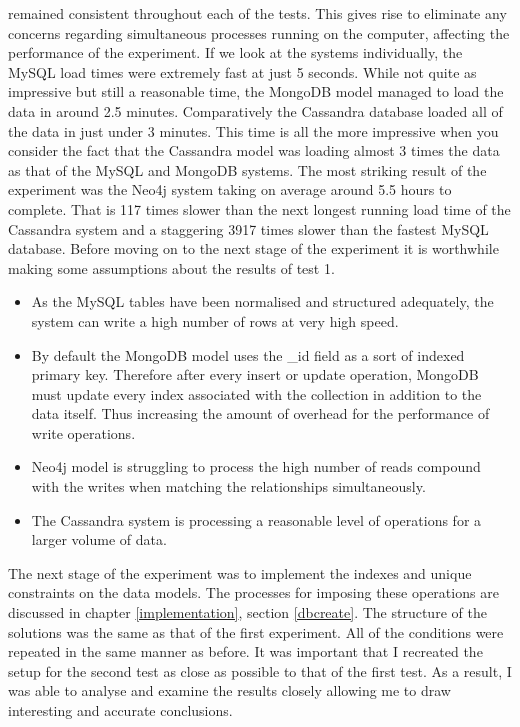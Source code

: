 \parindent 0pt
remained consistent throughout each of the tests. This gives rise to eliminate any concerns regarding simultaneous processes running on the computer, affecting the performance of the experiment.
\parindent 15pt
If we look at the systems individually, the MySQL load times were extremely fast at just 5 seconds. While not quite as impressive but still a reasonable time, the MongoDB model managed to load the data in around 2.5 minutes. Comparatively the Cassandra database loaded all of the data in just under 3 minutes. This time is all the more impressive when you consider the fact that the Cassandra model was loading almost 3 times the data as that of the MySQL and MongoDB systems. The most striking result of the experiment was the Neo4j system taking on average around 5.5 hours to complete. That is 117 times slower than the next longest running load time of the Cassandra system and a staggering 3917 times slower than the fastest MySQL database. Before moving on to the next stage of the experiment it is worthwhile making some assumptions about the results of test 1.
\begin{itemize}
\item As the MySQL tables have been normalised and structured adequately, the system can write a high number of rows at very high speed.
\item By default the MongoDB model uses the \_id field as a sort of indexed primary key. Therefore after every insert or update operation, MongoDB must update every index associated with the collection in addition to the data itself. Thus increasing the amount of overhead for the performance of write operations.
\item Neo4j model is struggling to process the high number of reads compound with the writes when matching the relationships simultaneously.
\item The Cassandra system is processing a reasonable level of operations for a larger volume of data.
\end{itemize}

The next stage of the experiment was to implement the indexes and unique constraints on the data models. The processes for imposing these operations are discussed in chapter \ref{implementation}, section \ref{dbcreate}. The structure of the solutions was the same as that of the first experiment. All of the conditions were repeated in the same manner as before. It was important that I recreated the setup for the second test as close as possible to that of the first test. As a result, I was able to analyse and examine the results closely allowing me to draw interesting and accurate conclusions.

